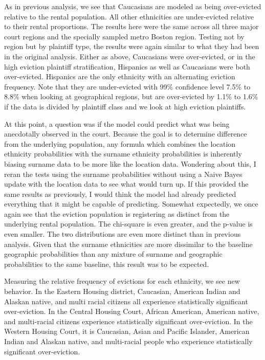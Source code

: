 \par As in previous analysis, we see that Caucasians are modeled as being over-evicted relative to the rental population.  All other ethnicities are under-evicted relative to their rental proportions.  The results here were the same across all three major court regions and the specially sampled metro Boston region.  Testing not by region but by plaintiff type, the results were again similar to what they had been in the original analysis.  Either as above, Caucasians were over-evicted, or in the high eviction plaintiff stratification, Hispanics as well as Caucasians were both over-evicted.  Hispanics are the only ethnicity with an alternating eviction frequency.  Note that they are under-evicted with 99\% confidence level 7.5\% to 8.8\% when looking at geographical regions, but are over-evicted by 1.1\% to 1.6\% if the data is divided by plaintiff class and we look at high eviction plaintiffs.

\par At this point, a question was if the model could predict what was being anecdotally observed in the court.  Because the goal is to determine difference from the underlying population, any formula which combines the location ethnicity probabilities with the surname ethnicity probabilities is inherently biasing surname data to be more like the location data.  Wondering about this, I reran the tests using the surname probabilities without using a Naive Bayes update with the location data to see what would turn up.  If this provided the same results as previously, I would think the model had already predicted everything that it might be capable of predicting.  Somewhat expectedly, we once again see that the eviction population is registering as distinct from the underlying rental population.  The chi-square is even greater, and the p-value is even smaller.  The two distributions are even more distinct than in previous analysis.  Given that the surname ethnicities are more dissimilar to the baseline geographic probabilities than any mixture of surname and geographic probabilities to the same baseline, this result was to be expected.

\par Measuring the relative frequency of evictions for each ethnicity, we see new behavior.  In the Eastern Housing district, Caucasian, American Indian and Alaskan native, and multi racial citizens all experience statistically significant over-eviction.  In the Central Housing Court, African American, American native, and multi-racial citizens experience statistically significant over-eviction.  In the Western Housing Court, it is Caucasian, Asian and Pacific Islander, American Indian and Alaskan native, and multi-racial people who experience statistically significant over-eviction.

